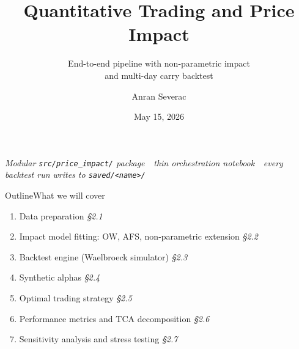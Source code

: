 \documentclass[aspectratio=169,11pt]{beamer}
\title{Quantitative Trading and Price Impact}
\subtitle{End-to-end pipeline with non-parametric impact \\ and multi-day carry backtest}
\author{Anran Severac}
\institute{MSc Mathematics \& Finance \,\textbar\, Final Project}
\date{May 15, 2026}
\begin{document}
\begin{frame}[plain]
  \titlepage
  \vspace*{-1em}
  \centering
  \scriptsize\itshape
  Modular \texttt{src/price\_impact/} package \,\textbar\, thin orchestration
  notebook \,\textbar\, every backtest run writes to \texttt{saved/<name>/}
\end{frame}

\begin{frame}{Outline}{What we will cover}

  \begin{enumerate}
    \item Data preparation \hfill \emph{\S2.1}
    \item Impact model fitting: OW, AFS, non-parametric extension \hfill \emph{\S2.2}
    \item Backtest engine (Waelbroeck simulator) \hfill \emph{\S2.3}
    \item Synthetic alphas \hfill \emph{\S2.4}
    \item Optimal trading strategy \hfill \emph{\S2.5}
    \item Performance metrics and TCA decomposition \hfill \emph{\S2.6}
    \item Sensitivity analysis and stress testing \hfill \emph{\S2.7}
  \end{enumerate}

\end{frame}
\end{document}
